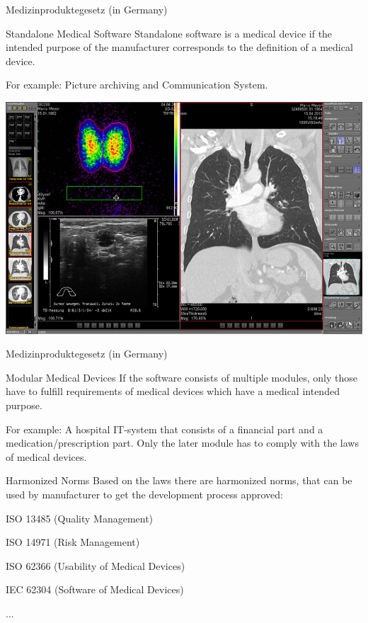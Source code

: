 \begin{frame}{Medizinproduktegesetz (in Germany)}
	\begin{block}{Standalone Medical Software}
		Standalone software is a medical device if the intended purpose of the manufacturer corresponds to the definition of a medical device. 
	\end{block}
		
	For example: Picture archiving and Communication System.
	
	\centering
	\includegraphics[width=0.7\linewidth]{content/images/certification/PACS}

	

\end{frame}


\begin{frame}{Medizinproduktegesetz (in Germany)}

	\begin{block}{Modular Medical Devices}
		If the software consists of multiple modules, only those have to fulfill requirements of medical devices which have a medical intended purpose.
	\end{block}
	\xxx
	For example: A hospital IT-system that consists of a financial part and a medication/prescription part. Only the later module has to comply  with the laws of medical devices.
\end{frame}



\begin{frame}{Harmonized Norms}
	Based on the laws there are harmonized norms, that can be used by manufacturer to get the development process approved:
	\xxx
	\begin{beameritemize}
		\item ISO 13485 (Quality Management)
		\item ISO 14971 (Risk Management)
		\item ISO 62366 (Usability of Medical Devices)
		\item IEC 62304 (Software of Medical Devices)
		\item ...
	\end{beameritemize}	
	
\end{frame}

